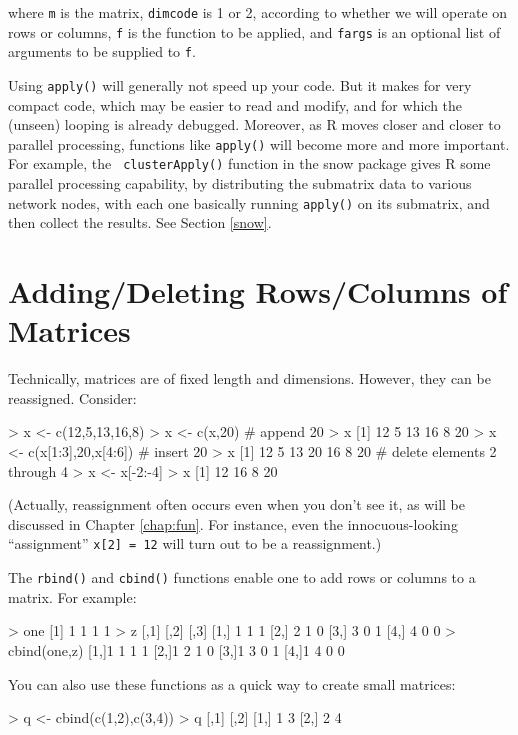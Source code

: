 \noindent
where {\tt m} is the matrix, {\tt dimcode} is 1 or 2, according to
whether we will operate on rows or columns, {\tt f} is the function to
be applied, and {\tt fargs} is an optional list of arguments to be
supplied to {\tt f}.

Using {\tt apply()} will generally not speed up your code.  But it makes
for very compact code, which may be easier to read and modify, and for
which the (unseen) looping is already debugged.  Moreover, as R moves
closer and closer to parallel processing, functions like {\tt apply()}
will become more and more important.  For example, the {\tt
clusterApply()} function in the snow package gives R some parallel
processing capability, by distributing the submatrix data to various
network nodes, with each one basically running {\tt apply()} on its
submatrix, and then collect the results.  See Section \ref{snow}.

\section{Adding/Deleting Rows/Columns of Matrices}
\label{rcbind}

Technically, matrices are of fixed length and dimensions.
However, they can be reassigned.  Consider:

\begin{Code}
> x <- c(12,5,13,16,8)
> x <- c(x,20)  # append 20
> x
[1] 12  5 13 16  8 20
> x <- c(x[1:3],20,x[4:6])  # insert 20
> x
[1] 12  5 13 20 16  8 20  # delete elements 2 through 4
> x <- x[-2:-4]
> x
[1] 12 16  8 20
\end{Code}

\noindent
(Actually, reassignment often occurs even when you don't see it, as
will be discussed in Chapter \ref{chap:fun}.  For instance, even the
innocuous-looking ``assignment'' {\tt x[2] = 12} will turn out to be a
reassignment.)

The {\tt rbind()} and {\tt cbind()} functions enable one to add rows or
columns to a matrix.  For example:

\begin{Code}
> one
[1] 1 1 1 1
> z
  [,1] [,2] [,3]
[1,] 1    1    1
[2,] 2    1    0
[3,] 3    0    1
[4,] 4    0    0
> cbind(one,z)
[1,]1 1 1 1
[2,]1 2 1 0
[3,]1 3 0 1
[4,]1 4 0 0
\end{Code}

You can also use these functions as a quick way to create small
matrices:

\begin{Code}
> q <- cbind(c(1,2),c(3,4))
> q
     [,1] [,2]
[1,]    1    3
[2,]    2    4
\end{Code}

